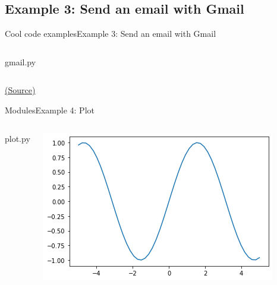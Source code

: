 \documentclass[10pt,compress]{beamer} %
\begin{document}
\subsection{Example 3: Send an email with Gmail}
\begin{frame}{Cool code examples}{Example 3: Send an email with Gmail}
	\begin{columns}
		\vspace{-0.2cm}
		\begin{exampleblock}{gmail.py}
		\vspace{-0.2cm}
		
		\end{exampleblock}
	\end{columns}

	\centering \tiny{\href{http://www.pythonforbeginners.com/code-snippets-source-code/using-python-to-send-email/}{(Source)}}
\end{frame}

\begin{frame}{Modules}{Example 4: Plot}
	\begin{columns}
 	   \column{.60\textwidth}

		\vspace{-0.2cm}
		\begin{exampleblock}{plot.py}
		\vspace{-0.2cm}
		
		\vspace{-0.2cm}
		\end{exampleblock}

  		\column{.50\textwidth}
		\vspace{-0.2cm}
		\centering \includegraphics[width=\linewidth]{figs/plot.png}\\
	\end{columns}
		\vspace{-0.2cm}
\end{frame}
\end{document}
